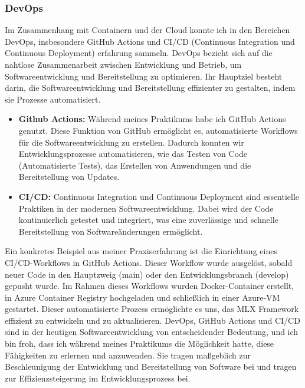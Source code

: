 \documentclass[11pt]{article}
\begin{document}
\subsubsection{DevOps}
Im Zusammenhang mit Containern und der Cloud konnte ich in den Bereichen DevOps, insbesondere GitHub Actions und CI/CD (Continuous Integration und Continuous Deployment) erfahrung sammeln. DevOps bezieht sich auf die nahtlose Zusammenarbeit zwischen Entwicklung und Betrieb, um Softwareentwicklung und Bereitstellung zu optimieren. Ihr Hauptziel besteht darin, die Softwareentwicklung und Bereitstellung effizienter zu gestalten, indem sie Prozesse automatisiert.
\begin{itemize}
    \item \textbf{Github Actions:} \newline
    Während meines Praktikums habe ich GitHub Actions genutzt. Diese Funktion von GitHub ermöglicht es, automatisierte Workflows für die Softwareentwicklung zu erstellen. Dadurch konnten wir Entwicklungsprozesse automatisieren, wie das Testen von Code (Automatisierte Tests), das Erstellen von Anwendungen und die Bereitstellung von Updates.

    \item \textbf{CI/CD:} \newline
    Continuous Integration und Continuous Deployment sind essentielle Praktiken in der modernen Softwareentwicklung. Dabei wird der Code kontinuierlich getestet und integriert, was eine zuverlässige und schnelle Bereitstellung von Softwareänderungen ermöglicht.
\end{itemize}
Ein konkretes Beispiel aus meiner Praxiserfahrung ist die Einrichtung eines CI/CD-Workflows in GitHub Actions. Dieser Workflow wurde ausgelöst, sobald neuer Code in den Hauptzweig (main) oder den Entwicklungsbranch (develop) gepusht wurde. Im Rahmen dieses Workflows wurden Docker-Container erstellt, in Azure Container Registry hochgeladen und schließlich in einer Azure-VM gestartet. Dieser automatisierte Prozess ermöglichte es uns, das MLX Framework effizient zu entwickeln und zu aktualisieren.
\newline
DevOps, GitHub Actions und CI/CD sind in der heutigen Softwareentwicklung von entscheidender Bedeutung, und ich bin froh, dass ich während meines Praktikums die Möglichkeit hatte, diese Fähigkeiten zu erlernen und anzuwenden. Sie tragen maßgeblich zur Beschleunigung der Entwicklung und Bereitstellung von Software bei und tragen zur Effizienzsteigerung im Entwicklungsprozess bei.
\end{document}
